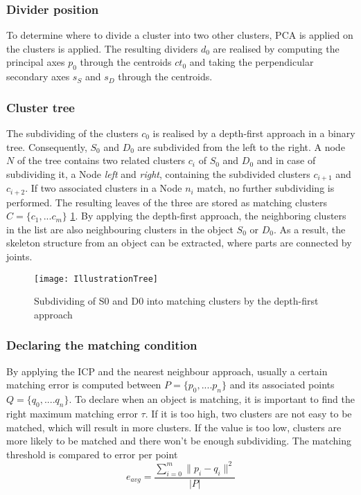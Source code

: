  \subsubsection{Divider position}
 
 To determine where to divide a cluster into two other clusters, PCA is applied on the clusters is applied. The resulting dividers $d_0$ are realised by computing the principal axes $p_0$ through the centroids $ct_0$ and taking the perpendicular secondary axes $s_S$ and $s_D$ through the centroids.
 
 \subsubsection{Cluster tree}
 \label{tree}
 
 The subdividing of the clusters $c_0$ is realised by a depth-first approach in a binary tree. Consequently, $S_0$ and $D_0$ are subdivided from the left to the right. A node $N$ of the tree contains two related clusters $c_i$ of $S_0$ and $D_0$ and in case of subdividing it, a Node \textit{left} and \textit{right}, containing the subdivided clusters $c_{i+1}$ and $c_{i+2}$. If two associated clusters in a Node $n_i$ match, no further subdividing is performed. The resulting leaves of the three are stored as matching clusters $C = \{{c_1, ... c_m}\}$ \ref{fig:illustrationTree}. By applying the depth-first approach, the neighboring clusters in the list are also neighbouring clusters in the object $S_0$ or $D_0$.  As a result, the skeleton structure from an object can be extracted, where parts are connected by joints.
 
 \begin{figure}
 	\centering
 	\texttt{[image: IllustrationTree]}
 	\caption{Subdividing of S0 and D0 into matching clusters by the depth-first approach}
 	\label{fig:illustrationTree}
 \end{figure}
 
 
 \subsubsection{Declaring the matching condition}
 
 By applying the ICP and the nearest neighbour approach, usually a certain matching error is computed between 
 $ P =  \{ {p_0,....p_n}\}$ and its associated points $ Q =  \{ {q_0,....q_n}\}$. To declare when an object is matching, it is important to find the right maximum matching error $\tau$. If it is too high, two clusters are not easy to be matched, which will result in more clusters. If the value is too low, clusters are more likely to be matched and there won't be enough subdividing. The matching threshold is compared to error per point 
 \begin{equation}
 e_{avg} = \frac{\displaystyle\sum_{i=0}^{m}\| p_i - q_i\|^2}{| P |}
 \end{equation}
 

